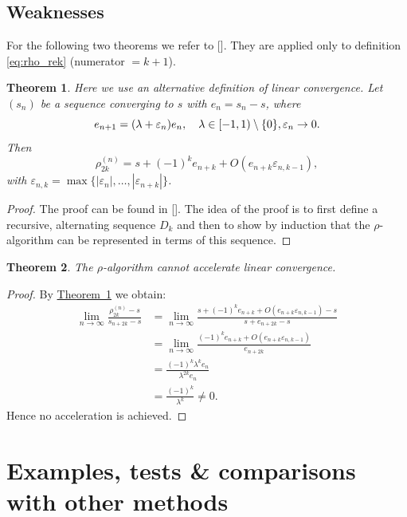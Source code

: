 \documentclass[a4paper,12pt]{article}
\numberwithin{equation}{section}
\newcommand{\sref}[1]{\hyperref[#1]{Theorem~\ref*{#1}}}
\newtheorem{satz}{Theorem}[section]
\theoremstyle{remark}
\begin{document}
\subsection{Weaknesses}\label{subsec:schwächen}
For the following two theorems we refer to [\cite[526-527]{osada1996acceleration}]. They are applied only to definition \eqref{eq:rho_rek} (numerator $= k+1$).
\begin{satz}\label{satz3}
\textnormal{Here we use an alternative definition of linear convergence.}
\textit{Let $(s_n)$ be a sequence converging to $s$ with $e_n = s_n - s$, where
\[
e_{n+1} = (\lambda + \varepsilon_n)e_n, \quad \lambda\in[-1,1)\setminus\{0\}, \space \varepsilon_n \to 0.
\]
Then
\[
\rho^{(n)}_{2k} = s + (-1)^k e_{n+k} + O(e_{n+k} \varepsilon_{n,k-1}),
\]
with $\varepsilon_{n,k} = \max\{ |\varepsilon_n|, \ldots, |\varepsilon_{n+k}| \}$.}
\end{satz}
\begin{proof}
The proof can be found in [\cite[526-527]{osada1996acceleration}]. The idea of the proof is to first define a recursive, alternating sequence $D_k$ and then to show by induction that the $\rho$-algorithm can be represented in terms of this sequence.
\end{proof}

\begin{satz}\label{satz4}
\textit{The $\rho$-algorithm cannot accelerate linear convergence.}
\end{satz}

\begin{proof}
By \sref{satz3} we obtain:
\begin{align*}
    \lim_{n \to \infty} \frac{ \rho^{(n)}_{2k} - s }{ s_{n+2k} - s } &= \lim_{n \to \infty} \frac{ s + (-1)^k e_{n+k} + O(e_{n+k} \varepsilon_{n,k-1}) - s }{ s + e_{n+2k} - s } \\
&=\lim_{n \to \infty} \frac{(-1)^k e_{n+k} + O(e_{n+k} \varepsilon_{n,k-1})}{e_{n+2k}} \\
&=\frac{(-1)^k\lambda^k e_{n}}{\lambda^{2k}e_{n}} \\
&=\frac{(-1)^k}{\lambda^k} \ne 0.
\end{align*}
Hence no acceleration is achieved.

\end{proof}
\newpage
\section{Examples, tests \& comparisons with other methods}\label{sec:beispiele}
\end{document}
